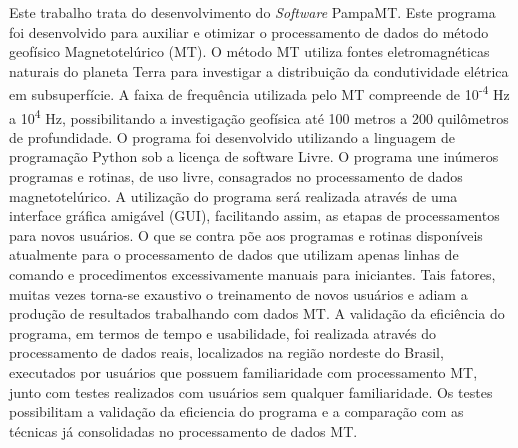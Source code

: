 \documentclass[12pt,twoside,oneright,a4paper,chapter=TITLE,english,brazil]{unipampa}
\newcommand{\en}[1]{\textit{#1}}
\newcommand{\Software}{\en{Software}}
\begin{document}
\begin{resumo}
 Este trabalho trata do desenvolvimento do \Software{} PampaMT. Este programa foi desenvolvido para auxiliar e otimizar o processamento de dados do método geofísico Magnetotelúrico (MT). O método MT utiliza fontes eletromagnéticas naturais do planeta Terra para investigar a distribuição da condutividade elétrica em subsuperfície. A faixa de frequência utilizada pelo MT compreende de 10\textsuperscript{-4} Hz a 10\textsuperscript{4} Hz, possibilitando a investigação geofísica até 100 metros a 200 quilômetros de profundidade. O programa foi desenvolvido utilizando a linguagem de programação Python sob a licença de software Livre. O programa une inúmeros programas e rotinas, de uso livre, consagrados no processamento de dados magnetotelúrico. A utilização do programa será realizada através de uma interface gráfica amigável (GUI), facilitando assim, as etapas de processamentos para novos usuários. O que se contra põe aos programas e rotinas disponíveis atualmente para o processamento de dados que utilizam apenas linhas de comando e procedimentos excessivamente manuais para iniciantes. Tais fatores, muitas vezes torna-se exaustivo o treinamento de novos usuários e adiam a produção de resultados trabalhando com dados MT. 
 A validação da eficiência do programa, em termos de tempo e usabilidade, foi realizada através do processamento de dados reais, localizados na região nordeste do Brasil, executados por usuários que possuem familiaridade com processamento MT, junto com testes realizados com usuários sem qualquer familiaridade. Os testes possibilitam a validação da eficiencia do programa e a comparação com as técnicas já consolidadas no processamento de dados MT.  
\end{resumo}
\end{document}

